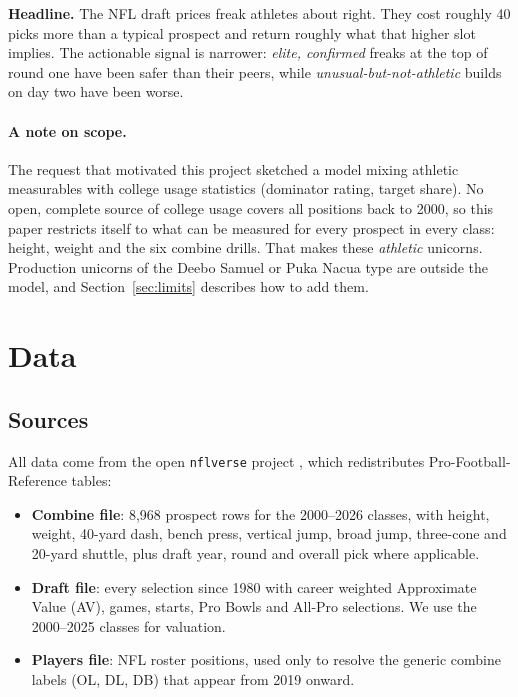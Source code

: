 \documentclass[11pt]{article}
\newcommand{\takeaway}[1]{\par\smallskip\noindent\colorbox{boxbg}{\parbox{\dimexpr\linewidth-2\fboxsep}{\sffamily\small #1}}\par\smallskip}
\begin{document}
\takeaway{\textbf{Headline.} The NFL draft prices freak athletes about right. They cost roughly 40 picks more than a typical prospect and return roughly what that higher slot implies. The actionable signal is narrower: \emph{elite, confirmed} freaks at the top of round one have been safer than their peers, while \emph{unusual-but-not-athletic} builds on day two have been worse.}

\paragraph{A note on scope.} The request that motivated this project sketched a model mixing athletic measurables with college usage statistics (dominator rating, target share). No open, complete source of college usage covers all positions back to 2000, so this paper restricts itself to what can be measured for every prospect in every class: height, weight and the six combine drills. That makes these \emph{athletic} unicorns. Production unicorns of the Deebo Samuel or Puka Nacua type are outside the model, and Section~\ref{sec:limits} describes how to add them.

\section{Data}\label{sec:data}

\subsection{Sources}

All data come from the open \texttt{nflverse} project \cite{nflverse}, which redistributes Pro-Football-Reference tables:

\begin{itemize}[leftmargin=1.4em]
\item \textbf{Combine file}: 8,968 prospect rows for the 2000--2026 classes, with height, weight, 40-yard dash, bench press, vertical jump, broad jump, three-cone and 20-yard shuttle, plus draft year, round and overall pick where applicable.
\item \textbf{Draft file}: every selection since 1980 with career weighted Approximate Value (AV), games, starts, Pro Bowls and All-Pro selections. We use the 2000--2025 classes for valuation.
\item \textbf{Players file}: NFL roster positions, used only to resolve the generic combine labels (OL, DL, DB) that appear from 2019 onward.
\end{itemize}
\end{document}
